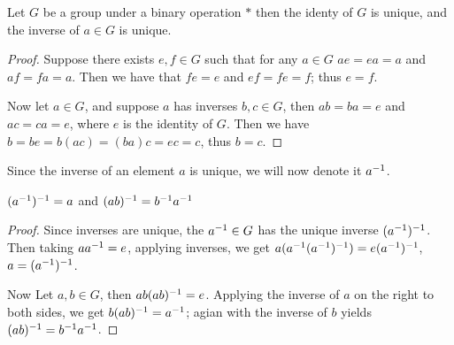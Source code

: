\begin{theorem}\label{theorem_1.2.1}
  Let $G$ be a group under a binary operation  $\ast$ then the identy of  $G$
  is unique, and the inverse of  $a \in G$ is unique.
\end{theorem}
\begin{proof}
  Suppose there exists $e,f \in G$ such that for any  $a \in G$  $ae=ea=a$ and
  $af=fa=a$. Then we have that $fe=e$ and  $ef=fe=f$; thus  $e=f$.

  Now let  $a \in G$, and suppose  $a$ has inverses  $b,c \in G$, then
  $ab=ba=e$ and  $ac=ca=e$, where  $e$ is the identity of  $G$. Then we have
  $b=be=b(ac)=(ba)c=ec=c$, thus $b=c$.
\end{proof}
\begin{remark}
  Since the inverse of an element $a$ is unique, we will now denote it
  $a^{-1}$.
\end{remark}
\begin{corollary}
  $(a^{-1})^{-1}=a$ and $(ab)^{-1}=b^{-1}a^{-1}$
\end{corollary}
\begin{proof}
  Since inverses are unique, the $a^{-1} \in G$ has the unique inverse
  $(a^{-1})^{-1}$. Then  taking $aa^{-1}=e$, applying inverses, we get
  $a(a^{-1}(a^{-1})^{-1})=e(a^{-1})^{-1}$, $a=(a^{-1})^{-1}$.

  Now Let $a,b \in G$, then $ab(ab)^{-1}=e$. Applying the inverse of $a$ on
  the right to both sides, we get  $b(ab)^{-1}=a^{-1}$; agian with the
  inverse of $b$ yields  $(ab)^{-1}=b^{-1}a^{-1}$.
\end{proof}


